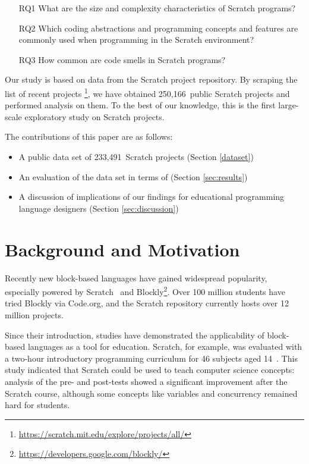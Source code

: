 \documentclass{sig-alternate}
\newcommand{\nPrograms}{250,166}
\newcommand{\nScriptPrograms}{233,491}
\begin{document}
\begin{itemize}
\item[RQ1] What are the size and complexity characteristics of Scratch programs?
\item[RQ2] Which coding abstractions and programming concepts and features are commonly used when programming in the Scratch environment?
\item[RQ3] How common are code smells in Scratch programs?
\end{itemize}

Our study is based on data from the Scratch project repository. By scraping the list of recent projects \footnote{\url{https://scratch.mit.edu/explore/projects/all/}}, we have obtained \nPrograms~public Scratch projects and performed analysis on them. To the best of our knowledge, this is the first large-scale exploratory study on Scratch projects.

The contributions of this paper are as follows:

\begin{itemize}
	\item{A public data set of \nScriptPrograms~Scratch projects (Section \ref{dataset})}
	\item{An evaluation of the data set in terms of (Section \ref{sec:results})}
	\item{A discussion of implications of our findings for educational programming language designers (Section \ref{sec:discussion})}
\end{itemize}


\section{Background and Motivation}
\label{sec:background}
Recently new block-based languages have gained widespread popularity, especially powered by Scratch~\cite{resnick_scratch:_2009} and Blockly\footnote{\url{https://developers.google.com/blockly/}}. Over 100 million students have tried Blockly via Code.org, and the Scratch repository currently hosts over 12 million projects. 

Since their introduction, studies have demonstrated the applicability of block-based languages as a tool for education. Scratch, for example, was evaluated with a two-hour introductory programming curriculum for 46 subjects aged 14~\cite{meerbaum-salant_learning_2010}. This study indicated that Scratch could be used to teach computer science concepts: analysis of the pre- and post-tests showed a significant improvement after the Scratch course, although some concepts like variables and concurrency remained hard for students.
\end{document}
